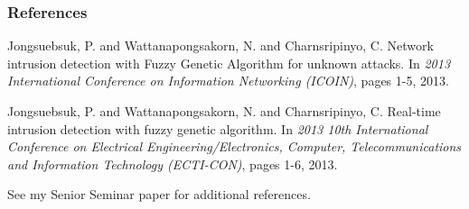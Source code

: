 \documentclass{beamer}
\newcommand{\linespace}{\vskip 0.25cm}
\begin{document}
\begin{frame} 
	\frametitle{References} 
	
	\begin{thebibliography}{lskdjf}
	
	\begin{small}
Jongsuebsuk, P. and Wattanapongsakorn, N. and Charnsripinyo, C.
\newblock Network intrusion detection with Fuzzy Genetic Algorithm for unknown attacks.
\newblock In \emph{2013 International Conference on Information Networking (ICOIN)}, pages 1-5, 2013.
	
	
Jongsuebsuk, P. and Wattanapongsakorn, N. and Charnsripinyo, C.
\newblock Real-time intrusion detection with fuzzy genetic algorithm.
\newblock In \emph{2013 10th International Conference on Electrical Engineering/Electronics, Computer, Telecommunications and Information Technology (ECTI-CON)}, pages 1-6, 2013.
	\end{small}
	
  	\end{thebibliography}
  	
  	\linespace
  	
  	\begin{center}
  	\begin{small}
  	See my Senior Seminar paper for additional references.
  	\end{small}
  	\end{center}
	
\end{frame} 
\end{document}
